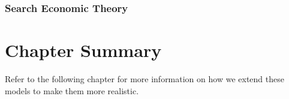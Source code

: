 \subsubsection{Search Economic Theory}\label{sec:stopping_background:models:theoretical:set}



\section{Chapter Summary}
Refer to the following chapter for more information on how we extend these models to make them more realistic.

%
%
%
%
%
%
%
%
% 
%
%
%
%
%
%
